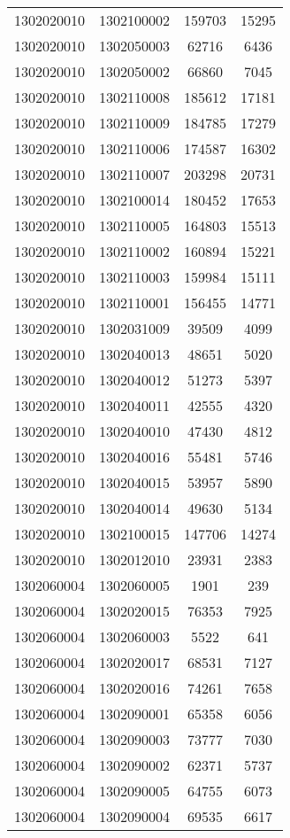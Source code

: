 \begin{longtable}{llcc}
1302020010 & 1302100002 & 159703 & 15295\\
1302020010 & 1302050003 & 62716 & 6436\\
1302020010 & 1302050002 & 66860 & 7045\\
1302020010 & 1302110008 & 185612 & 17181\\
1302020010 & 1302110009 & 184785 & 17279\\
1302020010 & 1302110006 & 174587 & 16302\\
1302020010 & 1302110007 & 203298 & 20731\\
1302020010 & 1302100014 & 180452 & 17653\\
1302020010 & 1302110005 & 164803 & 15513\\
1302020010 & 1302110002 & 160894 & 15221\\
1302020010 & 1302110003 & 159984 & 15111\\
1302020010 & 1302110001 & 156455 & 14771\\
1302020010 & 1302031009 & 39509 & 4099\\
1302020010 & 1302040013 & 48651 & 5020\\
1302020010 & 1302040012 & 51273 & 5397\\
1302020010 & 1302040011 & 42555 & 4320\\
1302020010 & 1302040010 & 47430 & 4812\\
1302020010 & 1302040016 & 55481 & 5746\\
1302020010 & 1302040015 & 53957 & 5890\\
1302020010 & 1302040014 & 49630 & 5134\\
1302020010 & 1302100015 & 147706 & 14274\\
1302020010 & 1302012010 & 23931 & 2383\\
1302060004 & 1302060005 & 1901 & 239\\
1302060004 & 1302020015 & 76353 & 7925\\
1302060004 & 1302060003 & 5522 & 641\\
1302060004 & 1302020017 & 68531 & 7127\\
1302060004 & 1302020016 & 74261 & 7658\\
1302060004 & 1302090001 & 65358 & 6056\\
1302060004 & 1302090003 & 73777 & 7030\\
1302060004 & 1302090002 & 62371 & 5737\\
1302060004 & 1302090005 & 64755 & 6073\\
1302060004 & 1302090004 & 69535 & 6617\\

\end{longtable}

